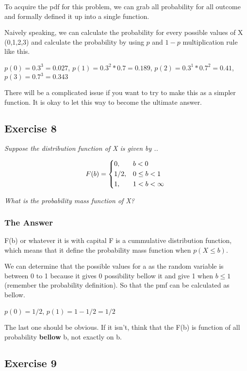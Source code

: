 \documentclass[12pt,a4paper]{article}
\begin{document}
To acquire the pdf for this problem, we can grab all probability for all outcome and formally defined it up into a single function.

Naively speaking, we can calculate the probability for every possible values of X (0,1,2,3) and calculate the probability by using $p$ and $1-p$ multiplication rule like this.

$p(0) = 0.3^3 = 0.027$,
$p(1) = 0.3^2 * 0.7 = 0.189$,
$p(2) = 0.3^1 * 0.7^2 = 0.41$,
$p(3) = 0.7^3 = 0.343$

There will be a complicated issue if you want to try to make this as a simpler function. It is okay to let this way to become the ultimate answer.

\subsection{Exercise 8}

\textit{Suppose the distribution function of X is given by .. }

\[
F(b) = \begin{dcases*}
0, & $b < 0$ \\
1/2, & $0 \leq b < 1$ \\
1, & $1 < b < \infty$ 
\end{dcases*}
\]

\textit{What is the probability mass function of X?}

\subsubsection{The Answer}

F(b) or whatever it is with capital F is a cummulative distribution function, which means that it define the probability mass function when $p(X \leq b)$.

We can determine that the possible values for a as the random variable is between 0 to 1 because it gives 0 possibility bellow it and give 1 when $b \leq 1$ (remember the probability definition). So that the pmf can be calculated as bellow.

$p(0) = 1/2$,
$p(1) = 1 - 1/2 = 1/2$

The last one should be obvious. If it isn't, think that the F(b) is function of all probability \textbf{bellow} b, not exactly on b.




\subsection{Exercise 9}
\end{document}
